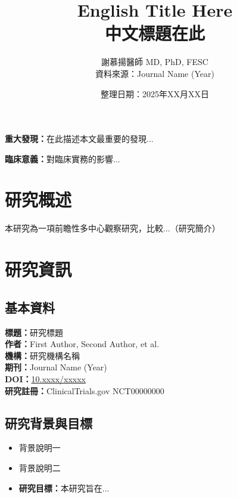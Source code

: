 \documentclass[12pt,a4paper]{article}
\title{\textbf{English Title Here\\
中文標題在此}}
\author{謝慕揚醫師 MD, PhD, FESC\\
資料來源：Journal Name (Year)}
\date{整理日期：2025年XX月XX日}
\begin{document}
\maketitle

\begin{tcolorbox}[colback=yellow!10!white,colframe=orange!75!black,title=核心發現摘要]
\textbf{重大發現：}在此描述本文最重要的發現...

\textbf{臨床意義：}對臨床實務的影響...
\end{tcolorbox}

\tableofcontents
\newpage

\section{研究概述}

本研究為一項前瞻性多中心觀察研究，比較...（研究簡介）

\section{研究資訊}

\subsection{基本資料}

\textbf{標題：}研究標題\\
\textbf{作者：}First Author, Second Author, et al.\\
\textbf{機構：}研究機構名稱\\
\textbf{期刊：}Journal Name (Year)\\
\textbf{DOI：}\href{https://doi.org/10.xxxx/xxxxx}{10.xxxx/xxxxx}\\
\textbf{研究註冊：}ClinicalTrials.gov NCT00000000

\subsection{研究背景與目標}

\begin{itemize}
    \item 背景說明一
    \item 背景說明二
    \item \textbf{研究目標：}本研究旨在...
\end{itemize}
\end{document}
